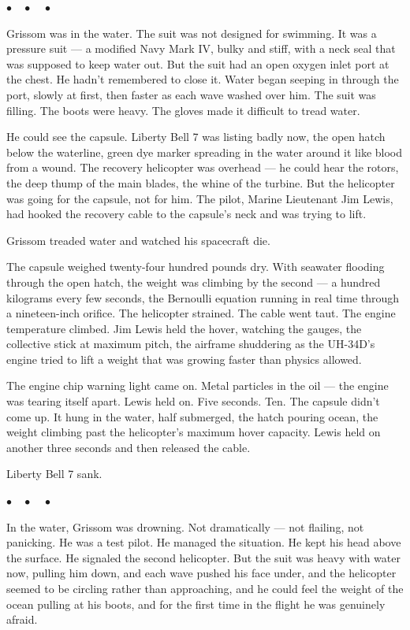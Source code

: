 \documentclass[12pt, letterpaper]{article}
\begin{document}
\begin{center}
$\bullet\quad\bullet\quad\bullet$
\end{center}

Grissom was in the water. The suit was not designed for swimming. It was a pressure suit --- a modified Navy Mark IV, bulky and stiff, with a neck seal that was supposed to keep water out. But the suit had an open oxygen inlet port at the chest. He hadn't remembered to close it. Water began seeping in through the port, slowly at first, then faster as each wave washed over him. The suit was filling. The boots were heavy. The gloves made it difficult to tread water.

He could see the capsule. Liberty Bell 7 was listing badly now, the open hatch below the waterline, green dye marker spreading in the water around it like blood from a wound. The recovery helicopter was overhead --- he could hear the rotors, the deep thump of the main blades, the whine of the turbine. But the helicopter was going for the capsule, not for him. The pilot, Marine Lieutenant Jim Lewis, had hooked the recovery cable to the capsule's neck and was trying to lift.

Grissom treaded water and watched his spacecraft die.

The capsule weighed twenty-four hundred pounds dry. With seawater flooding through the open hatch, the weight was climbing by the second --- a hundred kilograms every few seconds, the Bernoulli equation running in real time through a nineteen-inch orifice. The helicopter strained. The cable went taut. The engine temperature climbed. Jim Lewis held the hover, watching the gauges, the collective stick at maximum pitch, the airframe shuddering as the UH-34D's engine tried to lift a weight that was growing faster than physics allowed.

The engine chip warning light came on. Metal particles in the oil --- the engine was tearing itself apart. Lewis held on. Five seconds. Ten. The capsule didn't come up. It hung in the water, half submerged, the hatch pouring ocean, the weight climbing past the helicopter's maximum hover capacity. Lewis held on another three seconds and then released the cable.

Liberty Bell 7 sank.

\begin{center}
$\bullet\quad\bullet\quad\bullet$
\end{center}

In the water, Grissom was drowning. Not dramatically --- not flailing, not panicking. He was a test pilot. He managed the situation. He kept his head above the surface. He signaled the second helicopter. But the suit was heavy with water now, pulling him down, and each wave pushed his face under, and the helicopter seemed to be circling rather than approaching, and he could feel the weight of the ocean pulling at his boots, and for the first time in the flight he was genuinely afraid.
\end{document}
